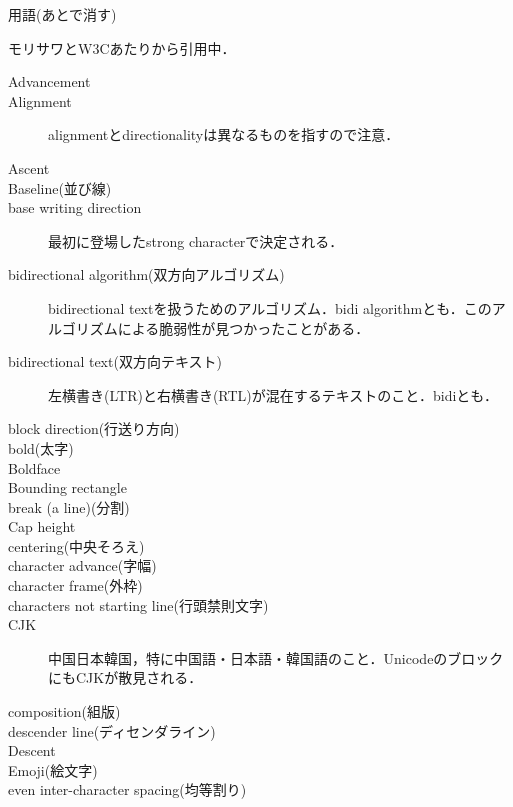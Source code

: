 用語(あとで消す)

モリサワとW3C\cite{www.w3.org:TR/2011/WD-jlreq-20111129/ja/}あたりから引用中．

\begin{description}
    \item[Advancement]
    \item[Alignment] alignmentとdirectionalityは異なるものを指すので注意\cite{developer.apple.com:videos/play/wwdc2016/232/}．
    \item[Ascent]
    \item[Baseline(並び線)]
    \item[base writing direction] 最初に登場したstrong characterで決定される\cite{developer.apple.com:videos/play/wwdc2016/232/}\cite{unicode.org:reports/tr9/}．
    \item[bidirectional algorithm(双方向アルゴリズム)] bidirectional textを扱うためのアルゴリズム\cite{www.w3.org:International/articles/inline-bidi-markup/uba-basics}．bidi algorithmとも．このアルゴリズムによる脆弱性が見つかったことがある\cite{jvndb.jvn.jp:ja/contents/2010/JVNDB-2010-002420.html}．
    \item[bidirectional text(双方向テキスト)] 左横書き(LTR)と右横書き(RTL)が混在するテキストのこと\cite{www.w3.org:International/articles/inline-bidi-markup/uba-basics}．bidiとも．
    \item[block direction(行送り方向)]
    \item[bold(太字)]
    \item[Boldface]
    \item[Bounding rectangle]
    \item[break (a line)(分割)]
    \item[Cap height]
    \item[centering(中央そろえ)]
    \item[character advance(字幅)]
    \item[character frame(外枠)]
    \item[characters not starting line(行頭禁則文字)]
    \item[CJK] 中国日本韓国，特に中国語・日本語・韓国語のこと．UnicodeのブロックにもCJKが散見される\cite{unicode.org:Public/UNIDATA/Blocks.txt}．
    \item[composition(組版)]
    \item[descender line(ディセンダライン)]
    \item[Descent]
    \item[Emoji(絵文字)]
    \item[even inter-character spacing(均等割り)]

\end{description}
